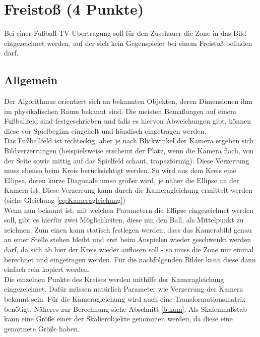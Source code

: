 \documentclass{ezb}
\begin{document}
\section{Freistoß (4 Punkte)}
Bei einer Fußball-TV-Übertragung soll für den Zuschauer die Zone in das Bild eingezeichnet werden, auf der sich kein Gegenspieler bei einem Freistoß befinden darf.
\subsection{Allgemein}
Der Algorithmus orientiert sich an bekannten Objekten, deren Dimensionen ihm im physikalischen Raum bekannt sind. Die meisten Bemaßungen auf einem Fußballfeld sind festgeschrieben und falls es hiervon Abweichungen gibt, können diese vor Spielbeginn eingeholt und händisch eingetragen werden.\\
\linebreak
Das Fußballfeld ist rechteckig, aber je nach Blickwinkel der Kamera ergeben sich Bildverzerrungen (beispielsweise erscheint der Platz, wenn die Kamera flach, von der Seite sowie mittig auf das Spielfeld schaut, trapezförmig). Diese Verzerrung muss ebenso beim Kreis berücksichtigt werden. So wird aus dem Kreis eine Ellipse, deren kurze Diagonale umso größer wird, je näher die Ellipse an der Kamera ist. Diese Verzerrung kann durch die Kameragleichung ermittelt werden (siehe Gleichung \ref{eq:Kameragleichung})\\
\linebreak
Wenn nun bekannt ist, mit welchen Parametern die Ellipse eingezeichnet werden soll, gibt es hierfür zwei Möglichkeiten, diese um den Ball, als Mittelpunkt zu zeichnen. Zum einen kann statisch festlegen werden, dass das Kamerabild genau an einer Stelle stehen bleibt und erst beim Anspielen wieder geschwenkt werden darf, da sich ab hier der Kreis wieder auflösen soll - so muss die Zone nur einmal berechnet und eingetragen werden. Für die nachfolgenden Bilder
kann diese dann einfach rein kopiert werden.\\ 
\linebreak
Die einzelnen Punkte des Kreises werden mithilfe der Kameragleichung eingezeichnet. Dafür müssen natürlich Parameter wie Verzerrung der Kamera bekannt sein. Für die Kameragleichung wird auch eine Transformationsmatrix benötigt. Näheres zur Berechnung siehe Abschnitt \ref{b:kam}. Als Skalenmaßstab kann eine Größe einer der Skalierobjekte genommen werden, da diese eine genormete Größe haben.\\
\linebreak
\end{document}
